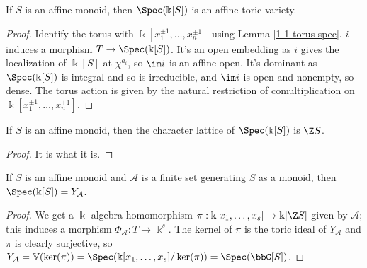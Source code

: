 \begin{proposition}
  \label{1-1-14-aff-tor-var-spec-aff-mon-alg}
  \leanok

  If $S$ is an affine monoid, then $\Spec(\Bbbk[S])$ is an affine toric variety.
\end{proposition}
\begin{proof}

  Identify the torus with $\Bbbk[x_1^{\pm1}, \dotsc, x_n^{\pm1}]$ using Lemma \ref{1-1-torus-spec}.
  $i$ induces a morphism $T \to \Spec(\Bbbk[S])$. It's an open embedding as $i$ gives the localization of $\Bbbk[S]$ at $\chi^{a_i}$, so $\im i$ is an affine open. It's dominant as $\Spec(\Bbbk[S])$ is integral and so is irreducible, and $\im i$ is open and nonempty, so dense. The torus action is given by the natural restriction of comultiplication on $\Bbbk[x_1^{\pm1}, \dotsc, x_n^{\pm1}]$.
\end{proof}


\begin{proposition}
  \label{1-1-14-char-spec-aff-mon-alg}

  If $S$ is an affine monoid, then the character lattice of $\Spec(\Bbbk[S])$ is $\Z S$.
\end{proposition}
\begin{proof}
  \uses{}

  It is what it is.
\end{proof}


\begin{proposition}
  \label{1-1-14-spec-aff-mon-alg-eq-ya}

  If $S$ is an affine monoid and $\mathcal A$ is a finite set generating $S$ as a monoid, then $\Spec(\Bbbk[S]) = Y_{\mathcal A}$.
\end{proposition}
\begin{proof}

  We get a $\Bbbk$-algebra homomorphism $\pi : \Bbbk[x_1, \dotsc, x_s] \to \Bbbk[\Z S]$ given by $\mathcal A$; this induces a morphism $\Phi_{\mathcal A} : T \to \Bbbk^s$. The kernel of $\pi$ is the toric ideal of $Y_{\mathcal A}$ and $\pi$ is clearly surjective, so $Y_{\mathcal A} = \mathbb V(\ker(\pi)) = \Spec(\Bbbk[x_1, \dotsc, x_s] / \ker(\pi)) = \Spec(\bbC[S])$.
\end{proof}


